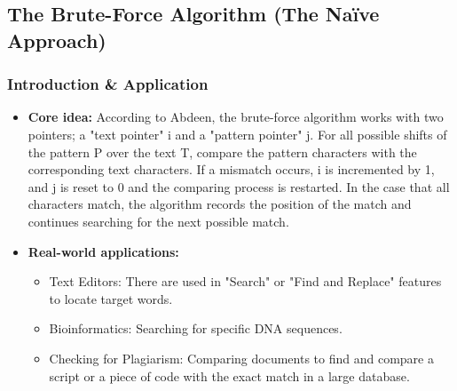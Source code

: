\subsection[The Brute-Force Algorithm]{The Brute-Force Algorithm (The Naïve Approach)}
    \subsubsection{Introduction \& Application}
        \begin{itemize}
            \item \textbf{Core idea:} According to Abdeen\cite{abdeen2011algorithm}, the brute-force algorithm works with two pointers; a "text pointer" i
        and a "pattern pointer" j. For all possible shifts of the pattern P over the text T,
        compare the pattern characters with the corresponding text characters.
        If a mismatch occurs, i is incremented by 1, and j is reset to 0 and the comparing
        process is restarted. In the case that all characters match, the algorithm records
        the position of the match and continues searching for the next possible match.
            \item \textbf{Real-world applications:}
            \begin{itemize}
                \item Text Editors: There are used in "Search" or "Find and Replace" features to locate target words.
                \item Bioinformatics: Searching for specific DNA sequences.
                \item Checking for Plagiarism: Comparing documents to find and compare a script or a piece of code with the exact match in a large database.
            \end{itemize}
        \end{itemize}

